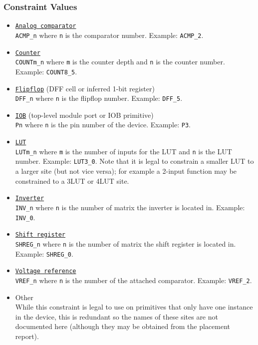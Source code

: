\documentclass[11pt]{article}
\newcommand{\tokenstyle}[1]{\texttt{#1}}
\newcommand{\valuestyle}[1]{\texttt{#1}}
\newcommand{\strvaluestyle}[1]{\valuestyle{\textquotedbl#1\textquotedbl}}
\newcommand{\whenstyle}[1]{{\fontseries{sb}\selectfont#1}}
\newcommand{\tokenref}[2]{\hyperref[#2]{\tokenstyle{#1}}}
\begin{document}
\subsubsection{Constraint Values}
\begin{itemize}
\item \whenstyle{\tokenref{Analog comparator}{gp-acmp}}\\
\strvaluestyle{ACMP\_n} where \tokenstyle{n} is the comparator number. Example: \strvaluestyle{ACMP\_2}.
\item \whenstyle{\tokenref{Counter}{gp-count8}}\\
\strvaluestyle{COUNTm\_n} where \tokenstyle{m} is the counter depth and \tokenstyle{n} is the counter number.
Example: \strvaluestyle{COUNT8\_5}.
\item \whenstyle{\tokenref{Flipflop}{gp-dff} (DFF cell or inferred 1-bit register)}\\
\strvaluestyle{DFF\_n} where \tokenstyle{n} is the flipflop number. Example: \strvaluestyle{DFF\_5}.
\item \whenstyle{\tokenref{IOB}{gp-iobuf} (top-level module port or IOB primitive)}\\
\strvaluestyle{Pn} where \tokenstyle{n} is the pin number of the device. Example: \strvaluestyle{P3}.
\item \whenstyle{\tokenref{LUT}{gp-2lut}}\\
\strvaluestyle{LUTm\_n} where \tokenstyle{m} is the number of inputs for the LUT and \tokenstyle{n} is the LUT number.
Example: \strvaluestyle{LUT3\_0}. Note that it is legal to constrain a smaller LUT to a larger site (but not vice
versa); for example a 2-input function may be constrained to a 3LUT or 4LUT site.
\item \whenstyle{\tokenref{Inverter}{gp-inv}}\\
\strvaluestyle{INV\_n} where \tokenstyle{n} is the number of matrix the inverter is located in. Example:
\strvaluestyle{INV\_0}.
\item \whenstyle{\tokenref{Shift register}{gp-shreg}}\\
\strvaluestyle{SHREG\_n} where \tokenstyle{n} is the number of matrix the shift register is located in.
Example: \strvaluestyle{SHREG\_0}.
\item \whenstyle{\tokenref{Voltage reference}{gp-vref}}\\
\strvaluestyle{VREF\_n} where \tokenstyle{n} is the number of the attached comparator. Example:
\strvaluestyle{VREF\_2}.
\item \whenstyle{Other} \\
While this constraint is legal to use on primitives that only have one instance in the device, this is redundant so the
names of these sites are not documented here (although they may be obtained from the placement report).
\end{itemize}
\end{document}
